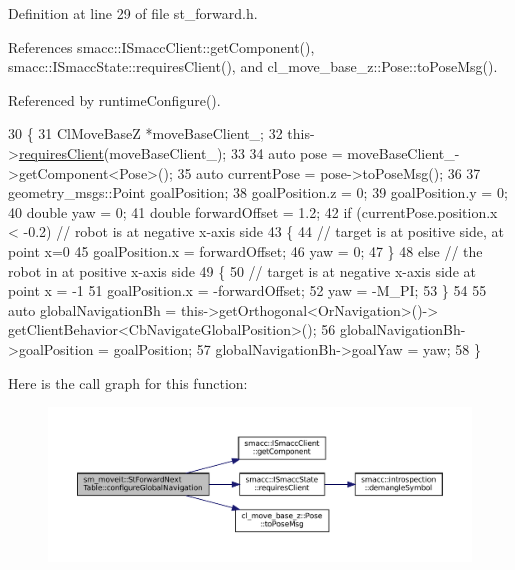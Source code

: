 Definition at line 29 of file st\+\_\+forward.\+h.



References smacc\+::\+I\+Smacc\+Client\+::get\+Component(), smacc\+::\+I\+Smacc\+State\+::requires\+Client(), and cl\+\_\+move\+\_\+base\+\_\+z\+::\+Pose\+::to\+Pose\+Msg().



Referenced by runtime\+Configure().


\begin{DoxyCode}
30   \{
31     ClMoveBaseZ *moveBaseClient\_;
32     this->\hyperlink{classsmacc_1_1ISmaccState_a7f95c9f0a6ea2d6f18d1aec0519de4ac}{requiresClient}(moveBaseClient\_);
33 
34     \textcolor{keyword}{auto} pose = moveBaseClient\_->getComponent<Pose>();
35     \textcolor{keyword}{auto} currentPose = pose->toPoseMsg();
36 
37     geometry\_msgs::Point goalPosition;
38     goalPosition.z = 0;
39     goalPosition.y = 0;
40     \textcolor{keywordtype}{double} yaw = 0;
41     \textcolor{keywordtype}{double} forwardOffset = 1.2;
42     \textcolor{keywordflow}{if} (currentPose.position.x < -0.2)  \textcolor{comment}{// robot is at negative x-axis side}
43     \{
44       \textcolor{comment}{// target is at positive side, at point x=0}
45       goalPosition.x = forwardOffset;
46       yaw = 0;
47     \}
48     \textcolor{keywordflow}{else}  \textcolor{comment}{// the robot in at positive x-axis side}
49     \{
50       \textcolor{comment}{// target is at negative x-axis side at point x = -1}
51       goalPosition.x = -forwardOffset;
52       yaw = -M\_PI;
53     \}
54 
55     \textcolor{keyword}{auto} globalNavigationBh = this->getOrthogonal<OrNavigation>()->
      getClientBehavior<CbNavigateGlobalPosition>();
56     globalNavigationBh->goalPosition = goalPosition;
57     globalNavigationBh->goalYaw = yaw;
58   \}
\end{DoxyCode}
Here is the call graph for this function\+:
\nopagebreak
\begin{figure}[H]
\begin{center}
\leavevmode
\includegraphics[width=350pt]{structsm__moveit_1_1StForwardNextTable_ac3b63f25fad5cecd8faa51b427719d07_cgraph}
\end{center}
\end{figure}
